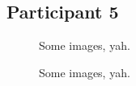 \lipsum[1]


\subsection{Participant 5}

\clearpage

\begin{figure}[h]
	\caption{Some images, yah.}
\end{figure}

\lipsum[1]

\clearpage

\begin{figure}[h]
	\caption{Some images, yah.}
\end{figure}

